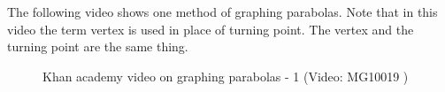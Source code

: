 \noindent
The following video shows one method of graphing parabolas. Note that in this video the term vertex is used in place of turning point. The vertex and the turning point are the same thing.
\setcounter{subfigure}{0}
\begin{figure}[H] %
\textnormal{Khan academy video on graphing parabolas - 1}\vspace{.1in} \nopagebreak
\label{m39345*yt-media1}\label{m39345*yt-video1}
 { (Video:  MG10019 )}
\vspace{2pt}
\vspace{.1in}
\end{figure} 

